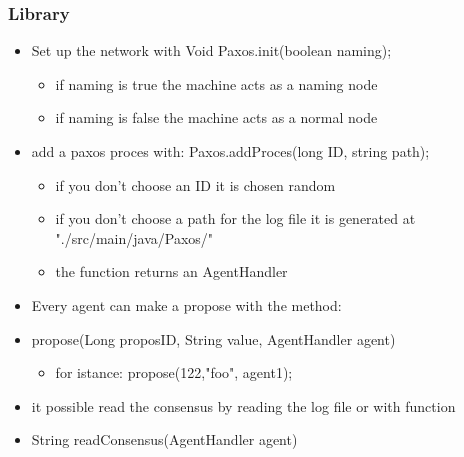\documentclass{beamer}
\begin{document}
\begin{frame}
  \frametitle{Library}
  \begin{itemize}
  \item Set up the network with Void Paxos.init(boolean naming);
  \begin{itemize}
  \item if naming is true the machine acts as a naming node
  \item if naming is false the machine acts as a normal node
  \end{itemize}
  \item add a paxos proces with: Paxos.addProces(long ID, string path);
  \begin{itemize}
  \item if you don't choose an ID it is chosen random
  \item if you don't choose a path for the log file it is generated at "./src/main/java/Paxos/"
  \item the function returns an AgentHandler
  \end{itemize}
  \end{itemize}
\end{frame}

\begin{frame}
  \begin{itemize}
  \item Every agent can make a propose with the method:
  \item propose(Long proposID, String value, AgentHandler agent)
  \begin{itemize}
  \item for istance: propose(122,"foo", agent1);
  \end{itemize}
  \item it possible read the consensus by reading the log file or with function
  \item String readConsensus(AgentHandler agent)
  \end{itemize}
\end{frame}
\end{document}
